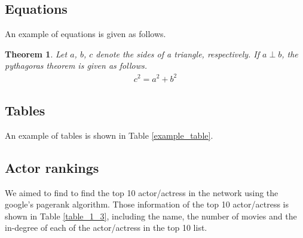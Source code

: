 \documentclass[11pt]{article}
\newtheorem{theorem}{Theorem}
\begin{document}
\subsection{Equations}
An example of equations is given as follows.
\begin{theorem}
Let $a$, $b$, $c$ denote the sides of a triangle, respectively. If $a\perp b$, the pythagoras theorem is given as follows.
\begin{align}
c^2 = a^2 + b^2
\end{align}
\end{theorem}

\subsection{Tables}
An example of tables is shown in Table \ref{example_table}.
\renewcommand\arraystretch{1.1}
\begin{table}[h]
\center
\caption{Standard CRC Codes versus Optimal CRC Codes for Convolutional Code $G=(561~753)$ with $n=504$ Bits}
\label{example_table}
\end{table}


\subsection{Actor rankings}
We aimed to find to find the top 10 actor/actress in the network using the google’s pagerank algorithm. Those information of the top 10 actor/actress is shown in Table \ref{table_1_3}, including the name, the number of movies and the in-degree of each of the actor/actress in the top 10 list.
\end{document}
